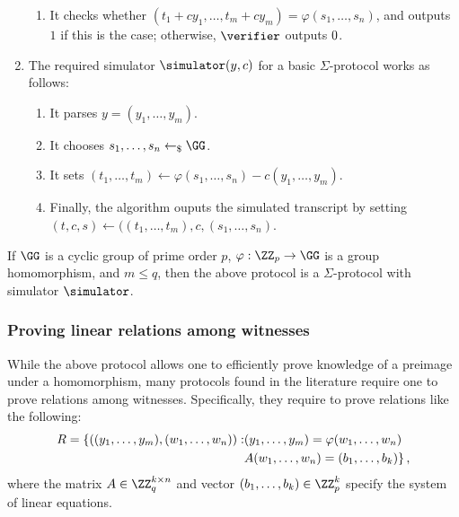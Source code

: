 \documentclass[runningheads]{llncs}
\begin{document}
\begin{enumerate}
\begin{enumerate}
      \item
	It checks whether $(t_1 + cy_1,\dots,t_m + cy_m) = \varphi(s_1,\dots,s_n)$, and outputs $1$ if this is the case; otherwise, $\verifier$ outputs $0$.
    \end{enumerate}
  \item\label{item:basic:sim}
    The required simulator $\simulator(y,c)$ for a basic $\Sigma$-protocol works as follows:
    \begin{enumerate}
      \item
        It parses $y=(y_1,\dots,y_m)$.
      \item\label{item:basic:sim:s}
        It chooses $s_1,\dots,s_n\getsr\GG$.
      \item
        It sets $(t_1,\dots,t_m) \gets \varphi(s_1,\dots,s_n) - c(y_1,\dots,y_m)$.
      \item
        Finally, the algorithm ouputs the simulated transcript by setting $(t,c,s)\gets((t_1,\dots,t_m),c,(s_1,\dots,s_n)$.
    \end{enumerate}
\end{enumerate}

\begin{theorem}
  If $\GG$ is a cyclic group of prime order $p$, $\varphi:\ZZ_p\to\GG$ is a group homomorphism, and $m\leq q$, then the above protocol is a $\Sigma$-protocol with simulator $\simulator$.
\end{theorem}

\subsubsection{Proving linear relations among witnesses}

  While the above protocol allows one to efficiently prove knowledge of a preimage under a homomorphism, many protocols found in the literature require one to prove relations among witnesses.
  Specifically, they require to prove relations like the following:
\begin{align*}
R=\{((y_1,\dots,y_m),(w_1,\dots,w_n)) :& (y_1,\dots,y_m)=\varphi(w_1,\dots,w_n) \\
                                               & A(w_1,\dots,w_n) = (b_1,\dots,b_k)\}\,,
\end{align*}
where the matrix $A\in\ZZ_q^{k\times n}$ and vector $(b_1,\dots,b_k)\in\ZZ_p^k$ specify the system of linear equations.
\end{document}
